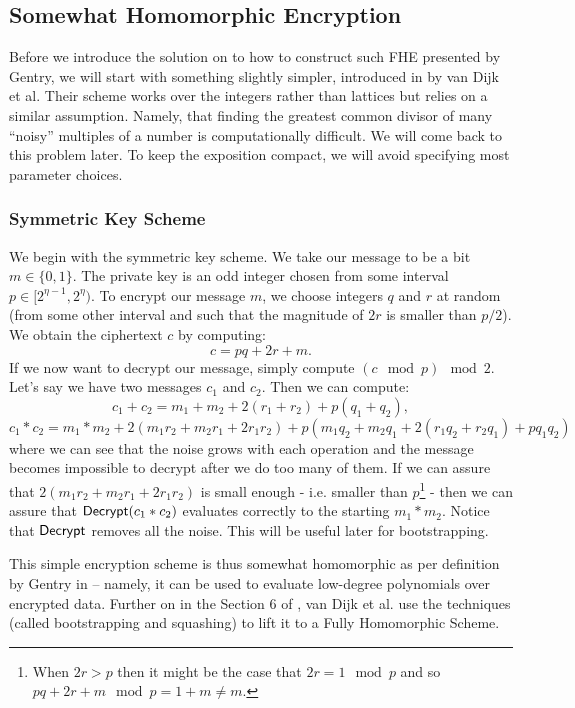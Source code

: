 \subsection{Somewhat Homomorphic Encryption}\label{int_she}
Before we introduce the solution on to how to construct such FHE presented by Gentry, we will start with something slightly simpler, introduced in \cite{int_scheme} by van Dijk et al. Their scheme works over the integers rather than lattices but relies on a similar assumption. Namely, that finding the greatest common divisor of many “noisy” multiples of a number is computationally difficult. We will come back to this problem later. To keep the exposition compact, we will avoid specifying most parameter choices. \\

\subsubsection*{Symmetric Key Scheme}
We begin with the symmetric key scheme. We take our message to be a bit $m \in \{0,1\}$. The private key is an odd integer chosen from some interval $p \in [2^{\eta - 1}, 2^{\eta})$. To encrypt our message $m$, we choose integers $q$ and $r$ at random (from some other interval and such that the magnitude of $2r$ is smaller than $p/2$). We obtain the ciphertext $c$ by computing: 
\begin{equation}c = pq + 2r + m.\end{equation}
If we now want to decrypt our message, simply compute $(c \mod p) \mod 2$. \\
Let's say we have two messages $c_1$ and $c_2$. Then we can compute:
$$ c_1 + c_2 = m_1 + m_2 + 2(r_1 + r_2) + p(q_1 + q_2),$$
$$ c_1 * c_2 = m_1 * m_2 + 2(m_1r_2 + m_2r_1 + 2r_1r_2) + p(m_1q_2 + m_2q_1 + 2(r_1q_2 + r_2q_1) + pq_1q_2)$$
where we can see that the noise grows with each operation and the message becomes impossible to decrypt after we do too many of them. If we can assure that $2(m_1r_2 + m_2r_1 + 2r_1r_2)$ is small enough - i.e. smaller than $p$\footnote{When $2r > p$ then it might be the case that $2r = 1 \mod p$ and so $pq + 2r + m \mod p = 1 + m \neq m$.} - then we can assure that $\alg{Decrypt}(c_1 * c_2)$ evaluates correctly to the starting $m_1 * m_2$. Notice that $\alg{Decrypt}$ removes all the noise. This will be useful later for bootstrapping.

This simple encryption scheme is thus somewhat homomorphic as per definition by Gentry in \cite{gentry_phd} – namely, it can be used to evaluate low-degree polynomials over encrypted data. Further on in the Section 6 of \cite{int_scheme}, van Dijk et al. use the techniques (called bootstrapping and squashing) to lift it to a Fully Homomorphic Scheme. \\

